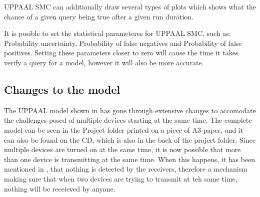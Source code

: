 UPPAAL SMC can additionally draw several types of plots which shows what the chance of a given query being true after a given run duration.

It is posible to set the statistical parameteres for UPPAAL SMC, such as: Probability uncertainty, Probability of false negatives and Probability of false positives. 
Setting these parameters closer to zero will cause the time it takes verify a query for a model, however it will also be more accurate. 


\subsection*{Changes to the model}

The UPPAAL model shown in  has gone through extensive changes to accomodate the challenges posed of multiple devices starting at the same time.
The complete model can be seen in the Project folder printed on a piece of A3-paper, and it can also be found on the CD, which is also in the back of the project folder.
Since multiple devices are turned on at the same time, it is now possible that more than one device is transmitting at the same time. 
When this happens, it has been mentioned in , that nothing is detected by the receivers, therefore a mechanism making sure that when two devices are trying to transmit at teh same time, nothing will be receieved by anyone.


